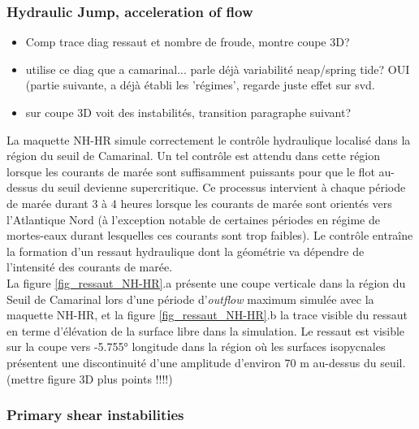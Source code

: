 \subsubsection{Hydraulic Jump, acceleration of flow}

\begin{itemize}
\item Comp trace diag ressaut et nombre de froude, montre coupe 3D?
\item utilise ce diag que a camarinal... parle déjà variabilité neap/spring tide? OUI (partie suivante, a déjà établi les 'régimes', regarde juste effet sur svd.
\item sur coupe 3D voit des instabilités, transition paragraphe suivant?
\end{itemize}

La maquette NH-HR simule correctement le contrôle hydraulique localisé dans la région du seuil de Camarinal. Un tel contrôle est attendu dans cette région lorsque les courants de marée sont suffisamment puissants pour que le flot au-dessus du seuil devienne supercritique. Ce processus intervient à chaque période de marée durant 3 à 4 heures lorsque les courants de marée sont orientés vers l'Atlantique Nord (à l'exception notable de certaines périodes en régime de mortes-eaux durant lesquelles ces courants sont trop faibles). Le contrôle entraîne la formation d'un ressaut hydraulique dont la géométrie va dépendre de l'intensité des courants de marée. \\
La figure \ref{fig_ressaut_NH-HR}.a présente une coupe verticale dans la région du Seuil de Camarinal lors d'une période d'\textit{outflow} maximum simulée avec la maquette NH-HR, et la figure \ref{fig_ressaut_NH-HR}.b la trace visible du ressaut en terme d'élévation de la surface libre dans la simulation. Le ressaut est visible sur la coupe vers -5.755° longitude dans la région où les surfaces isopycnales présentent une discontinuité d'une amplitude d'environ 70 m au-dessus du seuil.\\



(mettre figure 3D plus points !!!!)



\subsubsection{Primary shear instabilities}

